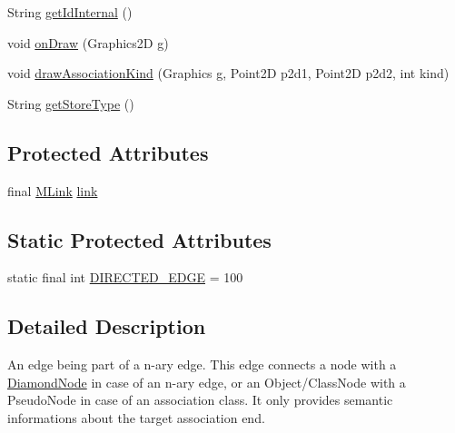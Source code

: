 \begin{DoxyCompactItemize}
\item 
String \hyperlink{classorg_1_1tzi_1_1use_1_1gui_1_1views_1_1diagrams_1_1elements_1_1edges_1_1_association_or_link_part_edge_a099162643bea610289d5e18607135232}{get\-Id\-Internal} ()
\item 
void \hyperlink{classorg_1_1tzi_1_1use_1_1gui_1_1views_1_1diagrams_1_1elements_1_1edges_1_1_association_or_link_part_edge_a9c4c557c758d2fb2c0f1903154eab775}{on\-Draw} (Graphics2\-D g)
\item 
void \hyperlink{classorg_1_1tzi_1_1use_1_1gui_1_1views_1_1diagrams_1_1elements_1_1edges_1_1_association_or_link_part_edge_a575b8b67ea50d3bbe12e5063f2506ffc}{draw\-Association\-Kind} (Graphics g, Point2\-D p2d1, Point2\-D p2d2, int kind)
\item 
String \hyperlink{classorg_1_1tzi_1_1use_1_1gui_1_1views_1_1diagrams_1_1elements_1_1edges_1_1_association_or_link_part_edge_a1d6550524cb57aca5235379e96fc9de8}{get\-Store\-Type} ()
\end{DoxyCompactItemize}
\subsection*{Protected Attributes}
\begin{DoxyCompactItemize}
\item 
final \hyperlink{interfaceorg_1_1tzi_1_1use_1_1uml_1_1sys_1_1_m_link}{M\-Link} \hyperlink{classorg_1_1tzi_1_1use_1_1gui_1_1views_1_1diagrams_1_1elements_1_1edges_1_1_association_or_link_part_edge_a0c94b7e965f812ad118f4f26012fa951}{link}
\end{DoxyCompactItemize}
\subsection*{Static Protected Attributes}
\begin{DoxyCompactItemize}
\item 
static final int \hyperlink{classorg_1_1tzi_1_1use_1_1gui_1_1views_1_1diagrams_1_1elements_1_1edges_1_1_association_or_link_part_edge_a3e17c05c5ae0cf04b4d7ca312368aa67}{D\-I\-R\-E\-C\-T\-E\-D\-\_\-\-E\-D\-G\-E} = 100
\end{DoxyCompactItemize}


\subsection{Detailed Description}
An edge being part of a n-\/ary edge. This edge connects a node with a \hyperlink{classorg_1_1tzi_1_1use_1_1gui_1_1views_1_1diagrams_1_1elements_1_1_diamond_node}{Diamond\-Node} in case of an n-\/ary edge, or an Object/\-Class\-Node with a Pseudo\-Node in case of an association class. It only provides semantic informations about the target association end.

